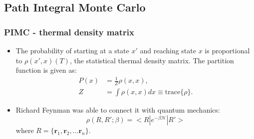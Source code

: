 \documentclass[xcolor=svgnames]{beamer}
\DeclareRobustCommand{\mc}[1]{\mathcal{#1}}
\begin{document}
	\subsection{Path Integral Monte Carlo}
        \begin{frame}
            \frametitle{PIMC - thermal density matrix}
            \begin{itemize}
                \justifying
                \item The probability of starting at a state $x'$ and reaching state $x$ is proportional to $\rho (x', x) (T)$, the statistical thermal density matrix. The partition function is given as: 
                \begin{equation*}
                    \begin{aligned}
                        P(x) &= \frac{1}{Z} \rho(x,x),\\
                        Z &= \int \rho(x,x) dx \equiv \text{trace} \{\rho\}.
                    \end{aligned}
                \end{equation*}
                \item Richard Feynman was able to connect it with quantum mechanics:
                \begin{equation*}\label{eq:rho}
                    \rho (R , R' ; \beta) = < R | e^{- \beta \mc{H} } | R' >
                \end{equation*}
                where $R = \{\bm{r}_1, \bm{r}_2, \ldots \bm{r}_n\}$.
            \end{itemize}
        \end{frame}
\end{document}
